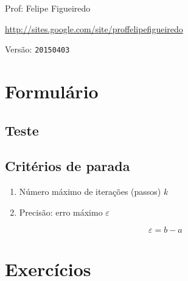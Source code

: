 \documentclass[a4paper]{article}
\begin{document}
\parbox[c]{.825\textwidth}{\raggedright%
{Prof: Felipe Figueiredo\par}
{\url{http://sites.google.com/site/proffelipefigueiredo}\par}
}

Versão: \verb|20150403|





\section{Formulário}

\subsection*{Teste}

\begin{center}
\end{center}

\subsection*{Critérios de parada}

\begin{enumerate}
\item Número máximo de iterações (passos) $k$

\item Precisão: erro máximo $\varepsilon$

\begin{displaymath}
  \varepsilon = b - a
\end{displaymath}

\end{enumerate}

\section{Exercícios}
\end{document}
